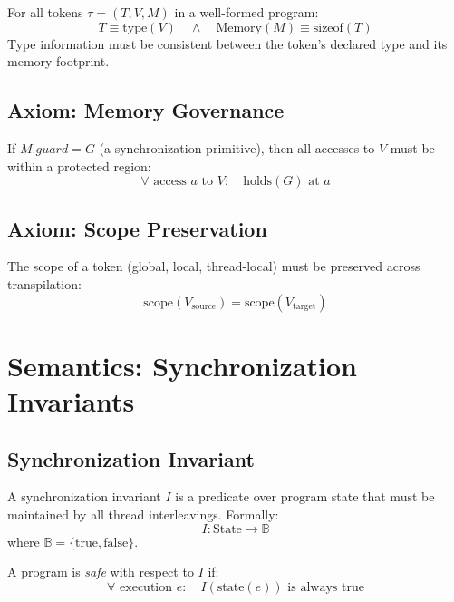 \documentclass[11pt]{article}
\begin{document}
\begin{axiom} \label{ax:typemem}
For all tokens $\tau = (T, V, M)$ in a well-formed program:
\[
T \equiv \text{type}(V) \quad \land \quad \text{Memory}(M) \equiv \text{sizeof}(T)
\]
Type information must be consistent between the token's declared type and its memory footprint.
\end{axiom}

\subsection{Axiom: Memory Governance}

\begin{axiom} \label{ax:memgov}
If $M.guard = G$ (a synchronization primitive), then all accesses to $V$ must be within a protected region:
\[
\forall \text{ access } a \text{ to } V: \quad \text{holds}(G) \text{ at } a
\]
\end{axiom}

\subsection{Axiom: Scope Preservation}

\begin{axiom} \label{ax:scope}
The scope of a token (global, local, thread-local) must be preserved across transpilation:
\[
\text{scope}(V_{\text{source}}) = \text{scope}(V_{\text{target}})
\]
\end{axiom}

\section{Semantics: Synchronization Invariants}

\subsection{Synchronization Invariant}

\begin{definition}
A synchronization invariant $I$ is a predicate over program state that must be maintained by all thread interleavings. Formally:
\[
I: \text{State} \to \mathbb{B}
\]
where $\mathbb{B} = \{\text{true}, \text{false}\}$.

A program is \textit{safe} with respect to $I$ if:
\[
\forall \text{ execution } e: \quad I(\text{state}(e)) \text{ is always true}
\]
\end{definition}
\end{document}

